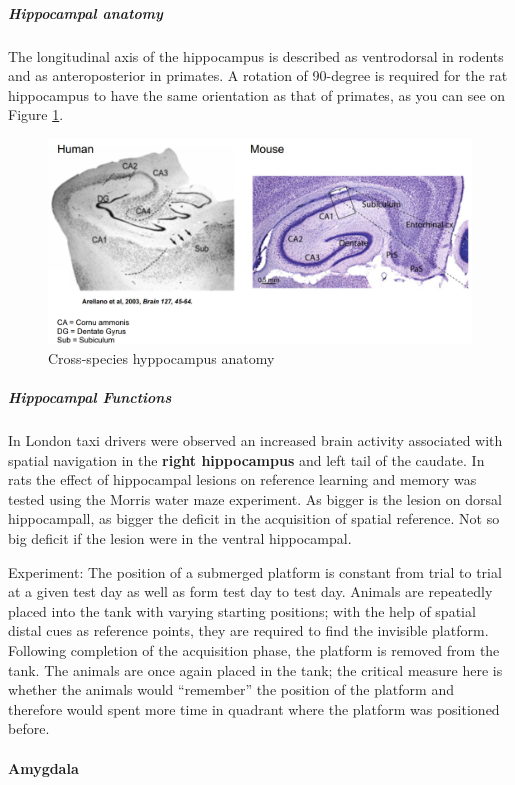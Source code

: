 \documentclass[12pt,article,oneside,a4paper]{memoir}
\begin{document}
\subparagraph{Hippocampal anatomy} The longitudinal axis of the hippocampus is described as ventrodorsal in rodents and as anteroposterior in primates. A rotation of 90-degree is required for the rat hippocampus to have the same orientation as that of primates, as you can see on Figure \ref{fig:hippocampusAnatomy}.
\begin{figure}[H]
	\centering
  	\includegraphics[width=\linewidth]{imgs/cross-species-hippocampus-anatomy.png}
	\caption{Cross-species hyppocampus anatomy}
  	\label{fig:hippocampusAnatomy}
\end{figure}

\subparagraph{Hippocampal Functions} In London taxi drivers were observed an increased brain activity associated with spatial navigation in the \textbf{right hippocampus} and left tail of the caudate. In rats the effect of hippocampal lesions on reference learning and memory was tested using the Morris water maze experiment. As bigger is the lesion on dorsal hippocampall, as bigger the deficit in the acquisition of spatial reference. Not so big deficit if the lesion were in the ventral hippocampal.

Experiment: The position of a submerged platform is constant from trial to trial at a given test day as well as form test day to test day. Animals are repeatedly placed into the tank with varying starting positions; with the help of spatial distal cues as reference points, they are required to find the invisible platform. Following completion of the acquisition phase, the platform is removed from the tank. The animals are once again placed in the tank; the critical measure here is whether the animals would “remember” the position of the platform and therefore would spent more time in quadrant where the platform was positioned before.

\paragraph{Amygdala}
\end{document}
